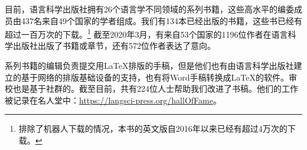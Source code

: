 目前，语言科学出版社拥有26个语言学不同领域的系列书籍，这些高水平的编委成员由437名来自49个国家的学者组成。我们有134本已经出版的书籍，这些书已经有超过一百万次的下载。\footnote{%
排除了机器人下载的情况，本书的英文版自2016年以来已经有超过4万次的下载。
} 截至2020年3月，有来自53个国家的1196位作者在语言科学出版社出版了书籍或章节，还有572位作者表达了意向。


系列书籍的编辑负责提交用\LaTeX{}排版的手稿，但是他们也有由语言科学出版社建立的基于网络的排版基础设备的支持，也有将Word手稿转换成\LaTeX{}的软件。审校也是基于社群的。截至目前，共有224位人士帮助我们改进了书稿。他们的工作被记录在名人堂中：\url{https://langsci-press.org/hallOfFame}。



